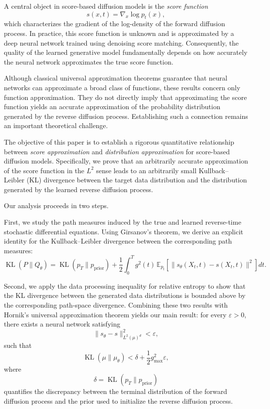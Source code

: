 \documentclass[11pt]{article}
\DeclareMathOperator{\KL}{KL}
\begin{document}
A central object in score-based diffusion models is the \emph{score function}
\[
s(x,t)=\nabla_x\log p_t(x),
\]
which characterizes the gradient of the log-density of the forward diffusion
process. In practice, this score function is unknown and is approximated by a
deep neural network trained using denoising score matching. Consequently, the
quality of the learned generative model fundamentally depends on how accurately
the neural network approximates the true score function.

Although classical universal approximation theorems guarantee that neural
networks can approximate a broad class of functions, these results concern only
function approximation. They do not directly imply that approximating the score
function yields an accurate approximation of the probability distribution
generated by the reverse diffusion process. Establishing such a connection
remains an important theoretical challenge.

The objective of this paper is to establish a rigorous quantitative relationship
between \emph{score approximation} and \emph{distribution approximation} for
score-based diffusion models. Specifically, we prove that an arbitrarily
accurate approximation of the score function in the $L^2$ sense leads to an
arbitrarily small Kullback--Leibler (KL) divergence between the target data
distribution and the distribution generated by the learned reverse diffusion
process.

Our analysis proceeds in two steps.

First, we study the path measures induced by the true and learned reverse-time
stochastic differential equations. Using Girsanov's theorem, we derive an
explicit identity for the Kullback--Leibler divergence between the corresponding
path measures:
\[
\KL(P\|Q_\theta)
=
\KL(p_T\|p_{\mathrm{prior}})
+
\frac12
\int_0^T
g^2(t)
\,
\mathbb E_{p_t}
\!\left[
\|s_\theta(X_t,t)-s(X_t,t)\|^2
\right]
dt.
\]

Second, we apply the data processing inequality for relative entropy to show
that the KL divergence between the generated data distributions is bounded
above by the corresponding path-space divergence. Combining these two results
with Hornik's universal approximation theorem yields our main result: for every
$\varepsilon>0$, there exists a neural network satisfying
\[
\|s_\theta-s\|_{L^2(\mu)^d}^2<\varepsilon,
\]
such that
\[
\KL(\mu\|\mu_\theta)
<
\delta
+
\frac12
g_{\max}^2
\varepsilon,
\]
where
\[
\delta=\KL(p_T\|p_{\mathrm{prior}})
\]
quantifies the discrepancy between the terminal distribution of the forward
diffusion process and the prior used to initialize the reverse diffusion
process.
\end{document}
